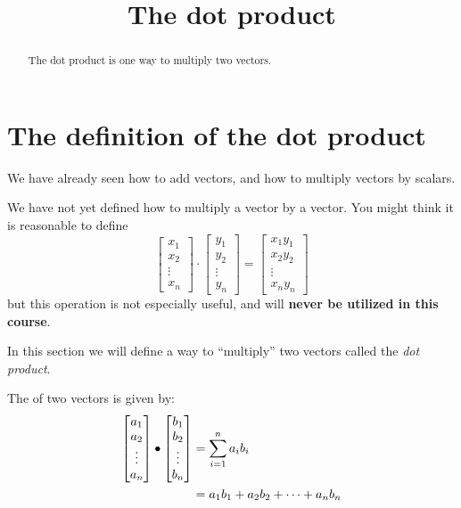 \documentclass{ximera}
\title[Dig-In:]{The dot product}
\begin{document}
\begin{abstract}
  The dot product is one way to multiply two vectors.
\end{abstract}
\maketitle


\section{The definition of the dot product}

We have already seen how to add vectors, and how to multiply vectors
by scalars.

\begin{warning}
We have not yet defined how to multiply a vector by a vector.  You
might think it is reasonable to define
\[
\begin{bmatrix}x_1\\x_2\\\vdots\\x_n\end{bmatrix} \cdot  \begin{bmatrix}y_1\\y_2\\\vdots\\y_n\end{bmatrix}=\begin{bmatrix}x_1y_1\\x_2y_2\\\vdots\\x_ny_n\end{bmatrix}
\] 
but this operation is not especially useful, and will \textbf{never be
  utilized in this course}.
\end{warning}

In this section we will define a way to ``multiply'' two vectors
called the \textit{dot product}.

\begin{definition}
  The  of two vectors is given by:
  \begin{align*}
  \begin{bmatrix}
    a_1\\
    a_2\\
    \vdots\\
    a_n
  \end{bmatrix}
  \bullet
  \begin{bmatrix}
    b_1\\
    b_2\\
    \vdots\\
    b_n
  \end{bmatrix}
  &= \sum_{i=1}^n a_ib_i\\
  &= a_1b_1 + a_2b_2 +\dots+a_nb_n
  \end{align*}
\end{definition}
\end{document}
